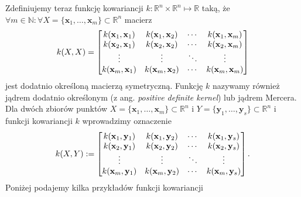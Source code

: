 \documentclass{myclass}
\begin{document}
Zdefiniujemy teraz funkcję kowariancji \(k: \mathbb{R}^n\times\mathbb{R}^n\mapsto\mathbb{R}\) taką,
że \(\forall m\in\mathbb{N} : \forall X = \{\mathbf{x}_1,\ldots,\mathbf{x}_m\} \subset
\mathbb{R}^n\) macierz
\begin{equation*}
    k(X,X) = \mqty[k(\mathbf{x}_1, \mathbf{x}_1) & k(\mathbf{x}_1, \mathbf{x}_2) & \cdots & k(\mathbf{x}_1, \mathbf{x}_m)\\
    k(\mathbf{x}_2, \mathbf{x}_1) & k(\mathbf{x}_2, \mathbf{x}_2) & \cdots & k(\mathbf{x}_2, \mathbf{x}_m)\\
    \vdots & \vdots & \ddots & \vdots\\
    k(\mathbf{x}_m, \mathbf{x}_1) & k(\mathbf{x}_m, \mathbf{x}_2) & \cdots & k(\mathbf{x}_m, \mathbf{x}_m)\\]
\end{equation*}
jest dodatnio określoną macierzą symetryczną. Funkcję \(k\) nazywamy również jądrem dodatnio
określonym (z ang. \textit{positive definite kernel}) lub jądrem Mercera. Dla dwóch zbiorów punktów
\(X = \{\mathbf{x}_1,\ldots,\mathbf{x}_m\} \subset \mathbb{R}^n\) i \(Y =
\{\mathbf{y}_1,\ldots,\mathbf{y}_s\} \subset \mathbb{R}^n\) i funkcji kowariancji \(k\) wprowadzimy
oznaczenie
\begin{equation*}
    k(X,Y) := \mqty[k(\mathbf{x}_1, \mathbf{y}_1) & k(\mathbf{x}_1, \mathbf{y}_2) & \cdots & k(\mathbf{x}_1, \mathbf{y}_s)\\
    k(\mathbf{x}_2, \mathbf{y}_1) & k(\mathbf{x}_2, \mathbf{y}_2) & \cdots & k(\mathbf{x}_2, \mathbf{y}_s)\\
    \vdots & \vdots & \ddots & \vdots\\
    k(\mathbf{x}_m, \mathbf{y}_1) & k(\mathbf{x}_m, \mathbf{y}_2) & \cdots & k(\mathbf{x}_m, \mathbf{y}_s)\\]\,.
\end{equation*}
Poniżej podajemy kilka przykładów funkcji kowariancji
\end{document}
